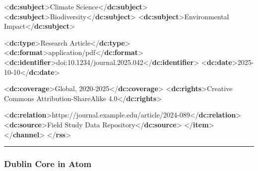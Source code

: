 \documentclass[
  letterpaper,
  DIV=11,
  numbers=noendperiod]{scrartcl}
\newenvironment{Shaded}{\begin{snugshade}}{\end{snugshade}}
\newcommand{\KeywordTok}[1]{\textcolor[rgb]{0.00,0.23,0.31}{\textbf{#1}}}
\newcommand{\NormalTok}[1]{\textcolor[rgb]{0.00,0.23,0.31}{#1}}
\begin{document}
\begin{Shaded}
\begin{Highlighting}[]
\NormalTok{      \textless{}}\KeywordTok{dc:subject}\NormalTok{\textgreater{}Climate Science\textless{}/}\KeywordTok{dc:subject}\NormalTok{\textgreater{}}
\NormalTok{      \textless{}}\KeywordTok{dc:subject}\NormalTok{\textgreater{}Biodiversity\textless{}/}\KeywordTok{dc:subject}\NormalTok{\textgreater{}}
\NormalTok{      \textless{}}\KeywordTok{dc:subject}\NormalTok{\textgreater{}Environmental Impact\textless{}/}\KeywordTok{dc:subject}\NormalTok{\textgreater{}}
      
\NormalTok{      \textless{}}\KeywordTok{dc:type}\NormalTok{\textgreater{}Research Article\textless{}/}\KeywordTok{dc:type}\NormalTok{\textgreater{}}
\NormalTok{      \textless{}}\KeywordTok{dc:format}\NormalTok{\textgreater{}application/pdf\textless{}/}\KeywordTok{dc:format}\NormalTok{\textgreater{}}
\NormalTok{      \textless{}}\KeywordTok{dc:identifier}\NormalTok{\textgreater{}doi:10.1234/journal.2025.042\textless{}/}\KeywordTok{dc:identifier}\NormalTok{\textgreater{}}
\NormalTok{      \textless{}}\KeywordTok{dc:date}\NormalTok{\textgreater{}2025{-}10{-}10\textless{}/}\KeywordTok{dc:date}\NormalTok{\textgreater{}}
      
\NormalTok{      \textless{}}\KeywordTok{dc:coverage}\NormalTok{\textgreater{}Global, 2020{-}2025\textless{}/}\KeywordTok{dc:coverage}\NormalTok{\textgreater{}}
\NormalTok{      \textless{}}\KeywordTok{dc:rights}\NormalTok{\textgreater{}Creative Commons Attribution{-}ShareAlike 4.0\textless{}/}\KeywordTok{dc:rights}\NormalTok{\textgreater{}}
  
\NormalTok{      \textless{}}\KeywordTok{dc:relation}\NormalTok{\textgreater{}https://journal.example.edu/article/2024{-}089\textless{}/}\KeywordTok{dc:relation}\NormalTok{\textgreater{}}
\NormalTok{      \textless{}}\KeywordTok{dc:source}\NormalTok{\textgreater{}Field Study Data Repository\textless{}/}\KeywordTok{dc:source}\NormalTok{\textgreater{}}
\NormalTok{    \textless{}/}\KeywordTok{item}\NormalTok{\textgreater{}}
\NormalTok{  \textless{}/}\KeywordTok{channel}\NormalTok{\textgreater{}}
\NormalTok{\textless{}/}\KeywordTok{rss}\NormalTok{\textgreater{}}
\end{Highlighting}
\end{Shaded}

\begin{center}\rule{0.5\linewidth}{0.5pt}\end{center}

\subsubsection{Dublin Core in Atom}\label{dublin-core-in-atom}
\end{document}
